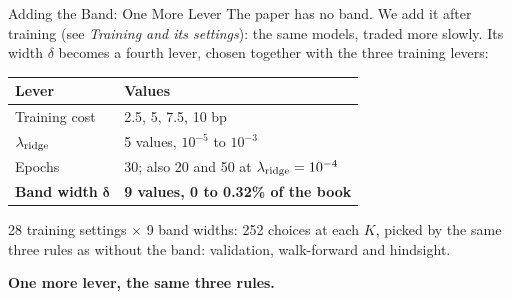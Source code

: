 \documentclass[11pt]{beamer}
\newcommand{\claim}[1]{%
  \par{\color{SBred}\bfseries #1\par}
}
\begin{document}
\begin{frame}{Adding the Band: One More Lever}
The paper has no band. We add it after training (see \emph{Training and its settings}): the same models, traded more slowly.
Its width $\delta$ becomes a fourth lever, chosen together with the three training levers:
\begin{center}
\begin{tabular}{@{}ll@{}}
\toprule
Lever & Values\\
\midrule
Training cost & 2.5, 5, 7.5, 10 bp\\
$\lambda_{\rm ridge}$ & 5 values, $10^{-5}$ to $10^{-3}$\\
Epochs & 30; also 20 and 50 at $\lambda_{\rm ridge}=10^{-4}$\\
\midrule
\textbf{Band width} $\boldsymbol{\delta}$ & \textbf{9 values, 0 to 0.32\% of the book}\\
\bottomrule
\end{tabular}
\end{center}
28 training settings $\times$ 9 band widths: 252 choices at each $K$, picked by the same three rules
as without the band: validation, walk-forward and hindsight.
\claim{One more lever, the same three rules.}
\end{frame}
\end{document}
